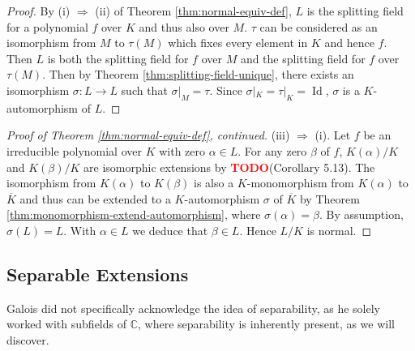 \documentclass[12pt]{article}
\newtheorem{corollary}[theorem]{Corollary}
\theoremstyle{definition}
\newcommand{\Id}{\operatorname{Id}}
\newcommand{\C}{\mathbb C}
\newcommand{\TODO}{\textbf{\textcolor{red}{TODO}}}
\begin{document}
\begin{proof}
	By (i) $\Rightarrow$ (ii) of Theorem \ref{thm:normal-equiv-def}, $L$ is the splitting field for a polynomial $f$ over $K$ and thus also over $M$. $\tau$ can be considered as an isomorphism from $M$ to $\tau(M)$ which fixes every element in $K$ and hence $f$. Then $L$ is both the splitting field for $f$ over $M$ and the splitting field for $f$ over $\tau(M)$. Then by Theorem \ref{thm:splitting-field-unique}, there exists an isomorphism $\sigma: L \to L$ such that $\sigma | _M = \tau$. Since $\sigma | _K = \tau |_K = \Id$, $\sigma$ is a $K$-automorphism of $L$. 
\end{proof}

\begin{proof}[Proof of Theorem \ref{thm:normal-equiv-def}, continued]
	    (iii) $\Rightarrow$ (i). Let $f$ be an irreducible polynomial over $K$ with zero $\alpha \in L$. For any zero $\beta$ of $f$, $K(\alpha)/K$ and $K(\beta)/K$ are isomorphic extensions by \TODO(Corollary 5.13). The isomorphism from $K(\alpha)$ to $K(\beta)$ is also a $K$-monomorphism from $K(\alpha)$ to $\overline K$ and thus can be extended to a $K$-automorphism $\sigma$ of $\overline K$ by Theorem \ref{thm:monomorphism-extend-automorphism}, where $\sigma(\alpha) = \beta$. By assumption, $\sigma(L) = L$. With $\alpha \in L$ we deduce that $\beta \in L$. Hence $L/K$ is normal.
\end{proof}

%
%


\subsection{Separable Extensions}

Galois did not specifically acknowledge the idea of separability, as he solely worked with subfields of $\C$, where separability is inherently present, as we will discover.
\end{document}
